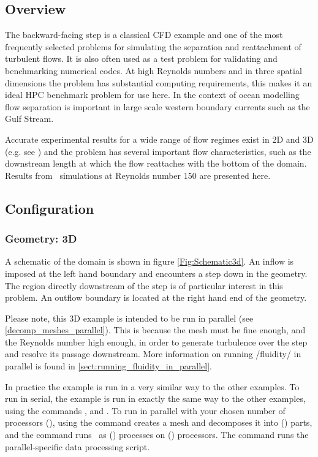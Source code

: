 \subsection{Overview}
The backward-facing step is a classical CFD example and one of the most frequently selected
problems for simulating the separation and reattachment of turbulent flows.
It is also often used as a test problem for validating and benchmarking numerical codes.
At high Reynolds numbers and in three spatial dimensions the problem has substantial
computing requirements, this makes it an ideal HPC benchmark problem for use here.
In the context of ocean modelling flow separation is important
in large scale western boundary currents such as the Gulf Stream.

Accurate experimental results for a wide range of flow regimes exist
in 2D and 3D
(e.g. see \cite{armaly1983}) and the problem has several important flow
characteristics, such as the downstream length at which the flow reattaches
with the bottom of the domain. Results from \fluidity\ simulations at Reynolds number 150
are presented here.


\subsection{Configuration}
\subsubsection{Geometry: 3D}
A schematic of the domain is shown in figure \ref{Fig:Schematic3d}.
An inflow is imposed at the left hand boundary and encounters a step
down in the geometry. The region directly downstream of the step is
of particular interest in this problem. An outflow boundary is located at the
right hand end of the geometry.

Please note, this 3D example is intended to be run in parallel (see \ref{decomp_meshes_parallel}).
This is because the mesh must be fine enough, and the Reynolds number high enough, in order to
generate turbulence over the step and resolve its passage downstream. More information on running
/fluidity/ in parallel is found in \ref{sect:running_fluidity_in_parallel}.

In practice the example is run in a very similar way to the other examples.
To run in serial, the example is run in exactly the same way to the other examples, using
the commands ,  and .
To run in parallel with your chosen number of processors (), using the command
 creates a mesh and decomposes it into () parts, and
the command  runs \fluidity\ as () processes on () processors.
The command  runs the parallel-specific data processing script.

